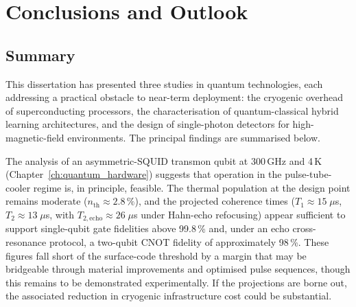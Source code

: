 \chapter{Conclusions and Outlook}
\label{ch:conclusions}

\section{Summary}

This dissertation has presented three studies in quantum technologies,
each addressing a practical obstacle to near-term deployment: the
cryogenic overhead of superconducting processors, the characterisation
of quantum-classical hybrid learning architectures, and the design of
single-photon detectors for high-magnetic-field environments.  The
principal findings are summarised below.

The analysis of an asymmetric-SQUID transmon qubit at 300\,GHz and
4\,K (Chapter~\ref{ch:quantum_hardware}) suggests that operation in
the pulse-tube-cooler regime is, in principle, feasible.  The thermal
population at the design point remains moderate ($n_{\mathrm{th}}
\approx 2.8\,\%$), and the projected coherence times ($T_1 \approx
15\;\mu$s, $T_2 \approx 13\;\mu$s, with $T_{2,\mathrm{echo}} \approx
26\;\mu$s under Hahn-echo refocusing) appear sufficient to support
single-qubit gate fidelities above 99.8\,\% and, under an echo
cross-resonance protocol, a two-qubit CNOT fidelity of approximately
98\,\%.  These figures fall short of the surface-code threshold by a
margin that may be bridgeable through material improvements and
optimised pulse sequences, though this remains to be demonstrated
experimentally.  If the projections are borne out, the associated
reduction in cryogenic infrastructure cost could be substantial.

